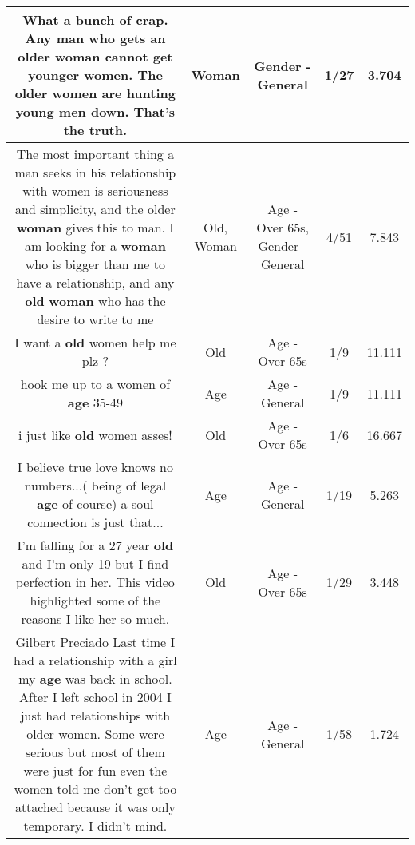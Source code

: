 \documentclass[11pt]{article}
\newlength\mylength
\begin{document}
\begin{center}
\begin{longtable}{|C{.65\mylength}|C{.30\mylength}|C{.12\mylength}|C{.12\mylength}|C{.12\mylength}|}
  \small What a bunch of crap. Any man who gets an older \textbf{woman} cannot get younger women. The older women are hunting young men down. That's the truth.\normalsize   & Woman & Gender - General & 1/27 & 3.704 \\  \hline
  \small The most important thing a man seeks in his relationship with women is seriousness and simplicity, and the older \textbf{woman} gives this to man. I am looking for a \textbf{woman} who is bigger than me to have a relationship, and any \textbf{old} \textbf{woman} who has the desire to write to me\normalsize   & Old, Woman & Age - Over 65s, Gender - General & 4/51 & 7.843 \\  \hline
  \small I want a \textbf{old} women help me plz ?\normalsize   & Old & Age - Over 65s & 1/9 & 11.111 \\  \hline
  \small hook me up to a women of \textbf{age} 35-49\normalsize   & Age & Age - General & 1/9 & 11.111 \\  \hline
  \small i just like \textbf{old} women asses!\normalsize   & Old & Age - Over 65s & 1/6 & 16.667 \\  \hline
  \small I believe true love knows no numbers...( being of legal \textbf{age} of course) a soul connection is just that...\normalsize   & Age & Age - General & 1/19 & 5.263 \\  \hline
  \small I'm falling for a 27 year \textbf{old} and I'm only 19  but I find perfection in her.  This video highlighted some of the reasons I like her so much.\normalsize   & Old & Age - Over 65s & 1/29 & 3.448 \\  \hline
  \small Gilbert Preciado Last time I had a relationship with a girl my \textbf{age} was back in school. After I left school in 2004 I just had relationships with older women. Some were serious but most of them were just for fun even the women told me don't get too attached because it was only temporary. I didn't mind.\normalsize   & Age & Age - General & 1/58 & 1.724 \\  \hline

\end{longtable}
\end{center}
\end{document}
